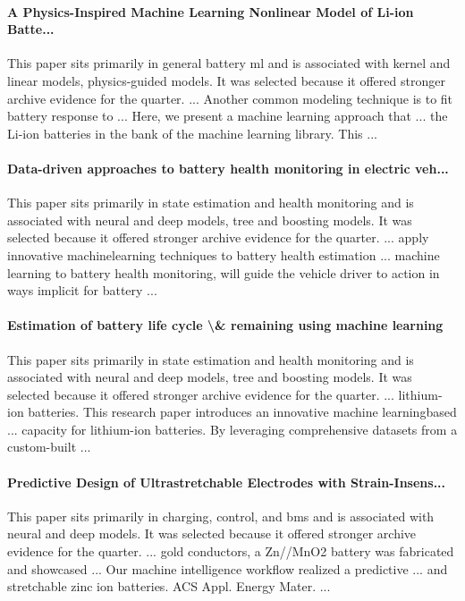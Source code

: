 \documentclass[conference]{IEEEtran}
\begin{document}
\paragraph{A Physics-Inspired Machine Learning Nonlinear Model of Li-ion Batte...} This paper sits primarily in general battery ml and is associated with kernel and linear models, physics-guided models. It was selected because it offered stronger archive evidence for the quarter. ... Another common modeling technique is to fit battery response to ... Here, we present a machine learning approach that ... the Li-ion batteries in the bank of the machine learning library. This ... \cite{aphysicsinspired2023}

\paragraph{Data-driven approaches to battery health monitoring in electric veh...} This paper sits primarily in state estimation and health monitoring and is associated with neural and deep models, tree and boosting models. It was selected because it offered stronger archive evidence for the quarter. ... apply innovative machinelearning techniques to battery health estimation ... machine learning to battery health monitoring, will guide the vehicle driver to action in ways implicit for battery ... \cite{datadrivenapproaches2024}

\paragraph{Estimation of battery life cycle \textbackslash{}\& remaining using machine learning} This paper sits primarily in state estimation and health monitoring and is associated with neural and deep models, tree and boosting models. It was selected because it offered stronger archive evidence for the quarter. ... lithium-ion batteries. This research paper introduces an innovative machine learningbased ... capacity for lithium-ion batteries. By leveraging comprehensive datasets from a custom-built ... \cite{estimationofbattery2024}

\paragraph{Predictive Design of Ultrastretchable Electrodes with Strain-Insens...} This paper sits primarily in charging, control, and bms and is associated with neural and deep models. It was selected because it offered stronger archive evidence for the quarter. ... gold conductors, a Zn//MnO2 battery was fabricated and showcased ... Our machine intelligence workflow realized a predictive ... and stretchable zinc ion batteries. ACS Appl. Energy Mater. ... \cite{predictivedesignof2024}
\end{document}
